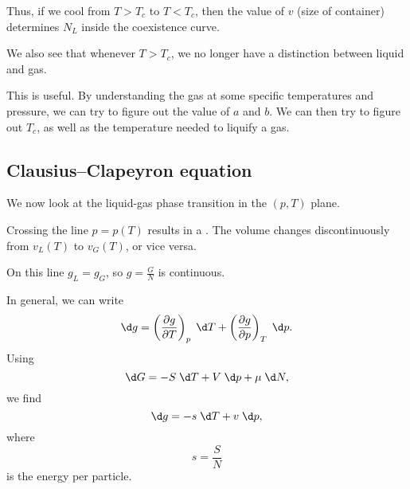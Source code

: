 \documentclass[a4paper]{article}
\begin{document}
\begin{center}
\end{center}
Thus, if we cool from $T > T_c$ to $T < T_c$, then the value of $v$ (size of container) determines $N_L$ inside the coexistence curve.

We also see that whenever $T > T_c$, we no longer have a distinction between liquid and gas.

This is useful. By understanding the gas at some specific temperatures and pressure, we can try to figure out the value of $a$ and $b$. We can then try to figure out $T_c$, as well as the temperature needed to liquify a gas.

\subsection{Clausius--Clapeyron equation}
We now look at the liquid-gas phase transition in the $(p, T)$ plane.
\begin{center}
\end{center}
Crossing the line $p = p(T)$ results in a . The volume changes discontinuously from $v_L(T)$ to $v_G(T)$, or vice versa.

On this line $g_L = g_G$, so $g = \frac{G}{N}$ is continuous.

In general, we can write
\[
  \d g = \left(\frac{\partial g}{\partial T}\right)_p \;\d T + \left(\frac{\partial g}{\partial p}\right)_T \;\d p.
\]
Using
\[
  \d G = -S\;\d T + V \;\d p + \mu \;\d N,
\]
we find
\[
  \d g = - s\;\d T + v\;\d p,
\]
where
\[
  s = \frac{S}{N}
\]
is the energy per particle.
\end{document}

